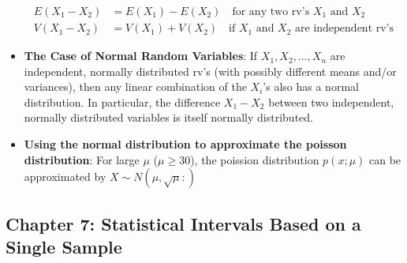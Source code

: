\documentclass{report}
\begin{document}
\begin{itemize}
            \begin{align}
                E(X_1 - X_2) &= E(X_1) - E(X_2) \quad \text{for any two rv's } X_1 \text{ and } X_2 \\
                V(X_1 - X_2) &= V(X_1) + V(X_2) \quad \text{if } X_1 \text{ and } X_2 \text{ are independent rv's}
            \end{align}
        \item \textbf{The Case of Normal Random Variables}:
            If \( X_1, X_2, \ldots, X_n \) are independent, normally distributed rv's (with possibly different means and/or variances), then any linear combination of the \( X_i \)'s also has a normal distribution. In particular, the difference \( X_1 - X_2 \) between two independent, normally distributed variables is itself normally distributed.

        \item \textbf{Using the normal distribution to approximate the poisson distribution}: For large $\mu$ ($\mu \geq 30$), the poission distribution $p(x; \mu)$ can be approximated by $ X\sim N(\mu, \sqrt{\mu}:)$

    \end{itemize}

    \pagebreak 
    \subsection{Chapter 7: Statistical Intervals Based on a Single Sample}
    \bigbreak \noindent 
\end{document}
